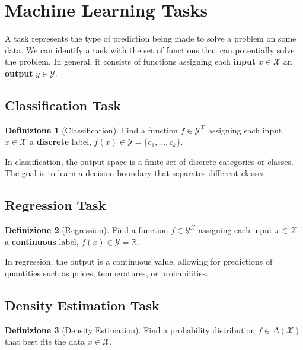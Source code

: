 \documentclass[11pt,a4paper]{article}
\theoremstyle{definition}
\newtheorem{definition}{Definizione}[section]
\theoremstyle{plain}
\theoremstyle{remark}
\begin{document}
\section{Machine Learning Tasks}

A task represents the type of prediction being made to solve a problem on some data. We can identify a task with the set of functions that can potentially solve the problem. In general, it consists of functions assigning each \textbf{input} $x \in \mathcal{X}$ an \textbf{output} $y \in \mathcal{Y}$.

\subsection{Classification Task}

\begin{definition}[Classification]
Find a function $f \in \mathcal{Y}^{\mathcal{X}}$ assigning each input $x \in \mathcal{X}$ a \textbf{discrete} label, $f(x) \in \mathcal{Y} = \{c_1, \ldots, c_k\}$.
\end{definition}

In classification, the output space is a finite set of discrete categories or classes. The goal is to learn a decision boundary that separates different classes.

\subsection{Regression Task}

\begin{definition}[Regression]
Find a function $f \in \mathcal{Y}^{\mathcal{X}}$ assigning each input $x \in \mathcal{X}$ a \textbf{continuous} label, $f(x) \in \mathcal{Y} = \mathbb{R}$.
\end{definition}

In regression, the output is a continuous value, allowing for predictions of quantities such as prices, temperatures, or probabilities.

\subsection{Density Estimation Task}

\begin{definition}[Density Estimation]
Find a probability distribution $f \in \Delta(\mathcal{X})$ that best fits the data $x \in \mathcal{X}$.
\end{definition}
\end{document}
